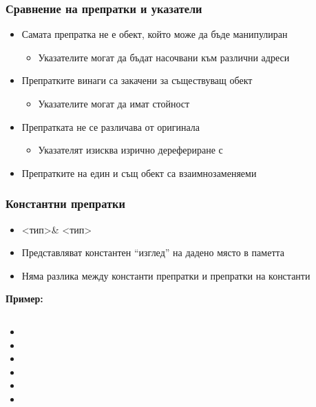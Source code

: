 \documentclass[alsotrans]{beamerswitch}
\newcommand{\labeledcell}[2]{
  \node [cell,label={\tt{#1}}] {\tt{#2}};
}
\begin{document}
\begin{frame}
  \frametitle{Сравнение на препратки и указатели}

  \begin{itemize}[<+->]
  \item Самата препратка не е обект, който може да бъде манипулиран
    \begin{itemize}
    \item Указателите могат да бъдат насочвани към различни адреси
    \end{itemize}
  \item Препратките винаги са закачени за съществуващ обект
    \begin{itemize}
    \item Указателите могат да имат стойност 
    \end{itemize}
  \item Препратката не се различава от оригинала
    \begin{itemize}
    \item Указателят изисква изрично дерефериране с \tt*
    \end{itemize}
  \item Препратките на един и същ обект са взаимнозаменяеми
  \end{itemize}
\end{frame}

\begin{frame}
  \frametitle{Константни препратки}

  \begin{itemize}[<+->]
  \item {}<тип>\tta\& \eqv <тип>
  \item Представляват константен ``изглед'' на дадено място в паметта
  \item Няма разлика между константи препратки и препратки на константи
  \end{itemize}
  \onslide<+->
  \textbf{Пример:}
  \begin{columns}[T,onlytextwidth]
    \begin{column}{.5\textwidth}
      \begin{itemize}[<+->]
      \item {}
      \item {}
      \item {}
      \item {}
      \item {}
      \item {}
      \end{itemize}
    \end{column}
    \begin{column}{.5\textwidth}
      \only<5>{\tikz{\labeledcell a3}}
      \only<6>{\tikz{\labeledcell a4}}
      \only<7>{\tikz{\labeledcell{a,b}4}}
      \only<8>{\tikz{\labeledcell{a,b}5}}
      \only<9->{\tikz{\labeledcell{a,b,\alert{c}}5}}
    \end{column}
  \end{columns}
\end{frame}
\end{document}

